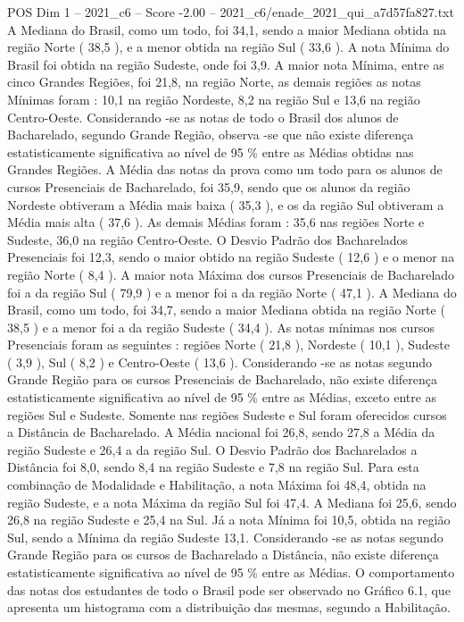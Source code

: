\begin{textsample}{POS Dim 1 – 2021\_c6 – Score -2.00 – 2021\_c6/enade\_2021\_qui\_a7d57fa827.txt}
A Mediana do Brasil, como um todo, foi 34,1, sendo a maior Mediana obtida na região Norte ( 38,5 ), e a menor obtida na região Sul ( 33,6 ).
A nota Mínima do Brasil foi obtida na região Sudeste, onde foi 3,9.
A maior nota Mínima, entre as cinco Grandes Regiões, foi 21,8, na região Norte, as demais regiões as notas Mínimas foram : 10,1 na região Nordeste, 8,2 na região Sul e 13,6 na região Centro-Oeste.
Considerando -se as notas de todo o Brasil dos alunos de Bacharelado, segundo Grande Região, observa -se que não existe diferença estatisticamente significativa ao nível de 95 \% entre as Médias obtidas nas Grandes Regiões.
A Média das notas da prova como um todo para os alunos de cursos Presenciais de Bacharelado, foi 35,9, sendo que os alunos da região Nordeste obtiveram a Média mais baixa ( 35,3 ), e os da região Sul obtiveram a Média mais alta ( 37,6 ).
As demais Médias foram : 35,6 nas regiões Norte e Sudeste, 36,0 na região Centro-Oeste.
O Desvio Padrão dos Bacharelados Presenciais foi 12,3, sendo o maior obtido na região Sudeste ( 12,6 ) e o menor na região Norte ( 8,4 ).
A maior nota Máxima dos cursos Presenciais de Bacharelado foi a da região Sul ( 79,9 ) e a menor foi a da região Norte ( 47,1 ).
A Mediana do Brasil, como um todo, foi 34,7, sendo a maior Mediana obtida na região Norte ( 38,5 ) e a menor foi a da região Sudeste ( 34,4 ).
As notas mínimas nos cursos Presenciais foram as seguintes : regiões Norte ( 21,8 ), Nordeste ( 10,1 ), Sudeste ( 3,9 ), Sul ( 8,2 ) e Centro-Oeste ( 13,6 ).
Considerando -se as notas segundo Grande Região para os cursos Presenciais de Bacharelado, não existe diferença estatisticamente significativa ao nível de 95 \% entre as Médias, exceto entre as regiões Sul e Sudeste.
Somente nas regiões Sudeste e Sul foram oferecidos cursos a Distância de Bacharelado.
A Média nacional foi 26,8, sendo 27,8 a Média da região Sudeste e 26,4 a da região Sul.
O Desvio Padrão dos Bacharelados a Distância foi 8,0, sendo 8,4 na região Sudeste e 7,8 na região Sul.
Para esta combinação de Modalidade e Habilitação, a nota Máxima foi 48,4, obtida na região Sudeste, e a nota Máxima da região Sul foi 47,4.
A Mediana foi 25,6, sendo 26,8 na região Sudeste e 25,4 na Sul.
Já a nota Mínima foi 10,5, obtida na região Sul, sendo a Mínima da região Sudeste 13,1.
Considerando -se as notas segundo Grande Região para os cursos de Bacharelado a Distância, não existe diferença estatisticamente significativa ao nível de 95 \% entre as Médias.
O comportamento das notas dos estudantes de todo o Brasil pode ser observado no Gráfico 6.1, que apresenta um histograma com a distribuição das mesmas, segundo a Habilitação.

\end{textsample}
